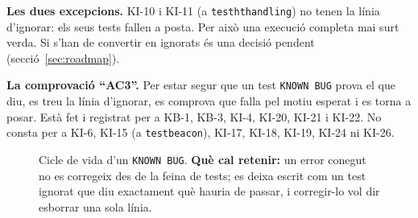 \documentclass[11pt,a4paper]{article}
\DeclareRobustCommand{\_}{\textunderscore\allowbreak}
\newcommand{\cd}[1]{\texttt{#1}}
\begin{document}
\textbf{Les dues excepcions.} KI-10 i KI-11 (a \cd{test\_ht\_handling}) no tenen la línia
d'ignorar: els seus tests fallen a posta. Per això una execució completa mai surt verda.
Si s'han de convertir en ignorats és una decisió pendent (secció~\ref{sec:roadmap}).

\textbf{La comprovació ``AC3''.} Per estar segur que un test \cd{KNOWN BUG} prova el que
diu, es treu la línia d'ignorar, es comprova que falla pel motiu esperat i es torna a
posar. Està fet i registrat per a KB-1, KB-3, KI-4, KI-20, KI-21 i KI-22. No consta per a
KI-6, KI-15 (a \cd{test\_beacon}), KI-17, KI-18, KI-19, KI-24 ni KI-26.

\begin{figure}[H]
\centering
{}
\caption{Cicle de vida d'un \cd{KNOWN BUG}. \textbf{Què cal retenir:} un error conegut no es corregeix
des de la feina de tests; es deixa escrit com un test ignorat que diu exactament què hauria de passar,
i corregir-lo vol dir esborrar una sola línia.}
\label{fig:kb}
\end{figure}
\end{document}
